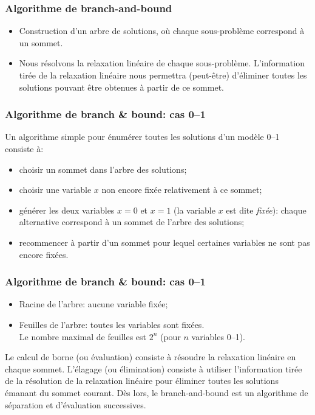 \documentclass[usepdftitle=false, aspectratio=169]{beamer}
\begin{document}
\begin{frame}
\frametitle{Algorithme de branch-and-bound}

\begin{itemize}
	\item 
Construction d'un arbre de solutions, où chaque sous-problème correspond à un sommet.
\item 
Nous résolvons la relaxation linéaire de chaque sous-problème.
L'information tirée de la relaxation linéaire nous permettra (peut-être) d'éliminer toutes les solutions pouvant être obtenues à partir de ce sommet.
\end{itemize}

\end{frame}

\begin{frame}
\frametitle{Algorithme de branch \& bound: cas 0--1}

Un algorithme simple pour énumérer toutes les solutions d'un modèle 0--1 consiste à:
\begin{itemize}
\item
choisir un sommet dans l'arbre des solutions;
\item
choisir une variable $x$ non encore fixée relativement à ce sommet;
\item
générer les deux variables $x = 0$ et $x = 1$ (la variable $x$ est dite {\sl fixée}): chaque alternative correspond à un sommet de l'arbre des solutions;
\item
recommencer à partir d'un sommet pour lequel certaines variables ne sont pas encore fixées.
\end{itemize}

\end{frame}

\begin{frame}
\frametitle{Algorithme de branch \& bound: cas 0--1}

\begin{itemize}
	\item 
Racine de l'arbre: aucune variable fixée;
\item
Feuilles de l'arbre: toutes les variables sont fixées.\\
Le nombre maximal de feuilles est $2^n$ (pour $n$ variables 0--1).
\end{itemize}

\mbox{}

Le calcul de borne (ou évaluation) consiste à résoudre la relaxation linéaire en chaque sommet.
L'élagage (ou élimination) consiste à utiliser l'information tirée de la résolution de la relaxation linéaire pour éliminer toutes les solutions émanant du sommet courant.
Dès lors, le branch-and-bound est un algorithme de séparation et d'évaluation successives.

\end{frame}
\end{document}
